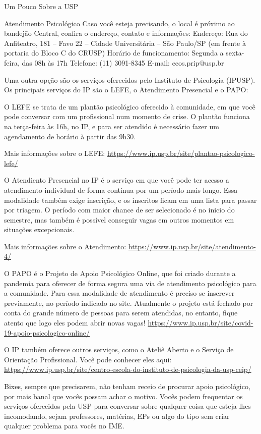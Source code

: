 \begin{secao}{Um Pouco Sobre a USP}
\begin{subsecao}{Atendimento Psicológico}
Caso você esteja precisando, o local é próximo ao bandejão Central, confira o endereço, contato e informações: 
Endereço: Rua do Anfiteatro, 181 – Favo 22 – Cidade Universitária – São Paulo/SP (em frente à portaria do Bloco C do CRUSP)
Horário de funcionamento: Segunda a sexta-feira, das 08h às 17h
Telefone: (11) 3091-8345
E-mail: ecos.prip@usp.br

Uma outra opção são os serviços oferecidos pelo Instituto de Psicologia (IPUSP).
Os principais serviços do IP são o LEFE, o Atendimento Presencial e o PAPO:

O LEFE se trata de um plantão psicológico oferecido à comunidade, em que
você pode conversar com um profissional num momento de crise. O plantão 
funciona na terça-feira às 16h, no IP, e para ser atendido é necessário
fazer um agendamento de horário à partir das 9h30.

Mais informações sobre o LEFE: 
\url{https://www.ip.usp.br/site/plantao-psicologico-lefe/}

O Atendiento Presencial no IP é o serviço em que você pode ter acesso a
atendimento individual de forma contínua por um período mais longo. Essa
modalidade também exige inscrição, e os inscritos ficam em uma lista para
passar por triagem. O período com maior chance de ser selecionado é no inicio
do semestre, mas também é possível conseguir vagas em outros momentos em 
situações excepcionais. 

Mais informações sobre o Atendimento:
\url{https://www.ip.usp.br/site/atendimento-4/}

O PAPO é o Projeto de Apoio Psicológico Online, que foi criado durante a 
pandemia para oferecer de forma segura uma via de atendimento psicológico
para a comunidade. Para essa modalidade de atendimento é preciso se inscrever
previamente, no período indicado no site. Atualmente o projeto está fechado
por conta do grande número de pessoas para serem atendidas, no entanto,  fique
atento que logo eles podem abrir novas vagas!
\url{https://www.ip.usp.br/site/covid-19-apoio-psicologico-online/}

O IP também oferece outros serviços, como o Ateliê Aberto e o Serviço
de Orientação Profissional. Você pode conhecer eles aqui:
\url{https://www.ip.usp.br/site/centro-escola-do-instituto-de-psicologia-da-usp-ceip/}


Bixes, sempre que precisarem, não tenham receio de procurar apoio
psicológico, por mais banal que vocês possam achar o motivo. Vocês
podem frequentar os serviços oferecidos pela USP para conversar sobre
qualquer coisa que esteja lhes incomodando, sejam professores,
matérias, EPs ou algo do tipo sem criar qualquer
problema para vocês no IME.


\end{subsecao}
\end{secao}
